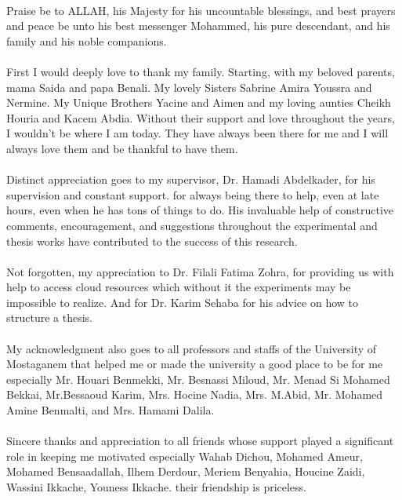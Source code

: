\paragraph{}
Praise be to ALLAH, his Majesty for his uncountable blessings, and best prayers and peace be unto his best messenger Mohammed, his pure descendant, and his family and his noble companions.
\paragraph{}
First I would deeply love to thank my family. Starting, with my beloved parents, mama Saida and papa Benali. My lovely Sisters Sabrine Amira Youssra and Nermine. My Unique Brothers Yacine and  Aimen and my loving aunties Cheikh Houria and Kacem Abdia. Without their support and love throughout the years, I wouldn't be where I am today. They have always been there for me and I will always love them and be thankful to have them. 
\paragraph{}
Distinct appreciation goes to my supervisor, Dr. Hamadi Abdelkader, for his supervision and constant support. for always being there to help, even at late hours, even when he has tons of things to do. His invaluable help of constructive comments, encouragement, and suggestions throughout the experimental and thesis works have contributed to the success of this research.
\paragraph{}
Not forgotten, my appreciation to Dr. Filali Fatima Zohra, for providing us with help to access cloud resources which without it the experiments may be impossible to realize. And for Dr. Karim Sehaba for his advice on how to structure a thesis. 
\paragraph{}
My acknowledgment also goes to all professors and staffs of the University of Mostaganem that helped me or made the university a good place to be for me especially Mr. Houari Benmekki, Mr. Besnassi Miloud, Mr. Menad Si Mohamed Bekkai, Mr.Bessaoud Karim, Mrs. Hocine Nadia, Mrs. M.Abid, Mr. Mohamed Amine Benmalti, and Mrs. Hamami Dalila.
\paragraph{}
Sincere thanks and appreciation to all friends whose support played a significant role in keeping me motivated especially Wahab Dichou, Mohamed Ameur, Mohamed Bensaadallah, Ilhem Derdour, Meriem Benyahia, Houcine Zaidi, Wassini Ikkache, Youness Ikkache. their friendship is priceless.
